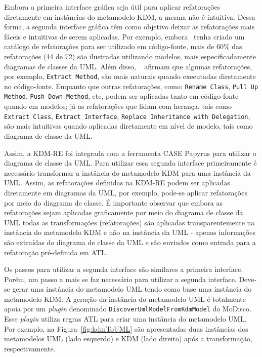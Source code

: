 Embora a primeira interface gráfica seja útil para aplicar refatorações diretamente em instâncias do metamodelo KDM, a mesma não é intuitiva. Dessa forma, a segunda interface gráfica têm como objetivo deixar as refatorações mais fáceis e intuitivas de serem aplicadas. Por exemplo, embora~ tenha criado um catálogo de refatorações para ser utilizado em código-fonte, mais de 60\% das refatorações (44 de 72) são ilustradas utilizando modelos, mais especificadamente diagramas de classes da UML. Além disso, ~ afirmam que algumas refatorações, por exemplo, \texttt{Extract Method}, são mais naturais quando executadas diretamente no código-fonte. Enquanto que outras refatorações, como: \texttt{Rename Class}, \texttt{Pull Up Method}, \texttt{Push Down Method}, etc, podem ser aplicadas tanto em código-fonte quando em modelos; já as refatorações que lidam com herança, tais como \texttt{Extract Class}, \texttt{Extract Interface}, \texttt{Replace Inheritance with Delegation}, são mais intuitivas quando aplicadas diretamente em nível de modelo, tais como diagrama de classe da UML. 

Assim, a KDM-RE foi integrada com a ferramenta CASE Papyrus para utilizar o diagrama de classe da UML. Para utilizar essa segunda interface primeiramente é necessário transformar a instância do metamodelo KDM para uma instância da UML. Assim, as refatorações definidas na KDM-RE podem ser aplicadas diretamente em diagramas da UML, por exemplo, pode-se aplicar refatorações por meio do diagrama de classe. É importante observar que embora as refatorações sejam aplicadas graficamente por meio do diagrama de classe da UML todas as transformações (refatorações) são aplicadas transparentemente na instância do metamodelo KDM e não na instância da UML - apenas informações são extraídas do diagrama de classe da UML e são enviados como entrada para a refatoração pré-definida em ATL. %


Os passos para utilizar a segunda interface são similares a primeira interface. Porém, um passo a mais se faz necessário para utilizar a segunda interface. Deve-se gerar uma instância do metamodelo UML tendo como base uma instância do metamodelo KDM. A geração da instância do metamodelo UML é totalmente apoia por um \textit{plugin} denominado \texttt{DiscoverUmlModelFromKdmModel} do MoDisco. Esse \textit{plugin} utiliza regras ATL para criar uma instância do metamodelo UML. Por exemplo, na Figura~\ref{fig:kdmToUML} são apresentadas duas instâncias dos metamodelos UML (lado esquerdo) e KDM (lado direito) após a transformação, respectivamente.

